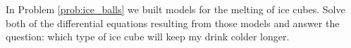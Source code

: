 \begin{problem}
    In Problem \ref{prob:ice_balls} we built models for the melting of ice cubes.  Solve
    both of the differential equations resulting from those models and answer the
    question: which type of ice cube will keep my drink colder longer.
\end{problem}

